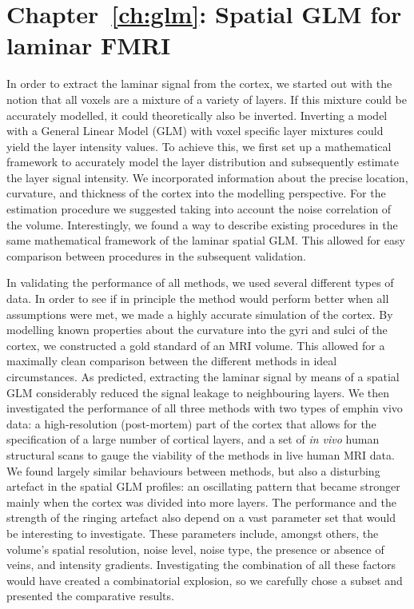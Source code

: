 \section*{Chapter~\ref{ch:glm}: Spatial GLM for laminar FMRI}
In order to extract the laminar signal from the cortex, we started out with the notion that all voxels are a mixture of a variety of layers. If this mixture could be accurately modelled, it could theoretically also be inverted. Inverting a model with a General Linear Model (GLM) with voxel specific layer mixtures could yield the layer intensity values. To achieve this, we first set up a mathematical framework to accurately model the layer distribution and subsequently estimate the layer signal intensity. We incorporated information about the precise location, curvature, and thickness of the cortex into the modelling perspective. For the estimation procedure we suggested taking into account the noise correlation of the volume. Interestingly, we found a way to describe existing procedures in the same mathematical framework of the laminar spatial GLM. This allowed for easy comparison between procedures in the subsequent validation.

In validating the performance of all methods, we used several different types of data. In order to see if in principle the method would perform better when all assumptions were met, we made a highly accurate simulation of the cortex. By modelling known properties about the curvature into the gyri and sulci of the cortex, we constructed a gold standard of an MRI volume. This allowed for a maximally clean comparison between the different methods in ideal circumstances. As predicted, extracting the laminar signal by means of a spatial GLM considerably reduced the signal leakage to neighbouring layers. We then investigated the performance of all three methods with two types of 
emph{in vivo} data: a high-resolution (post-mortem) part of the cortex that allows for the specification of a large number of cortical layers, and a set of \emph{in vivo} human structural scans to gauge the viability of the methods in live human MRI data. We found largely similar behaviours between methods, but also a disturbing artefact in the spatial GLM profiles: an oscillating pattern that became stronger mainly when the cortex was divided into more layers. The performance and the strength of the ringing artefact also depend on a vast parameter set that would be interesting to investigate. These parameters include, amongst others, the volume’s spatial resolution, noise level, noise type, the presence or absence of veins, and intensity gradients. Investigating the combination of all these factors would have created a combinatorial explosion, so we carefully chose a subset and presented the comparative results.

